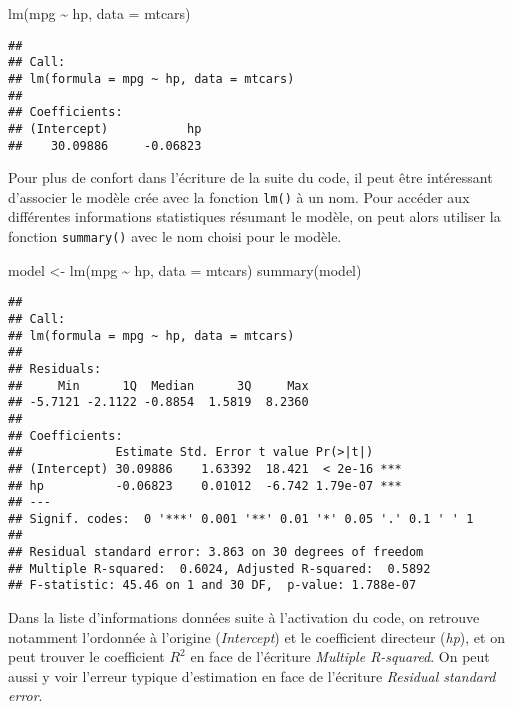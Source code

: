 \documentclass[
]{book}
\newenvironment{Shaded}{\begin{snugshade}}{\end{snugshade}}
\newcommand{\AttributeTok}[1]{\textcolor[rgb]{0.77,0.63,0.00}{#1}}
\newcommand{\FunctionTok}[1]{\textcolor[rgb]{0.00,0.00,0.00}{#1}}
\newcommand{\NormalTok}[1]{#1}
\newcommand{\OtherTok}[1]{\textcolor[rgb]{0.56,0.35,0.01}{#1}}
\newcommand{\SpecialCharTok}[1]{\textcolor[rgb]{0.00,0.00,0.00}{#1}}
\begin{document}
\begin{Shaded}
\begin{Highlighting}[]
\FunctionTok{lm}\NormalTok{(mpg }\SpecialCharTok{\textasciitilde{}}\NormalTok{ hp, }\AttributeTok{data =}\NormalTok{ mtcars)}
\end{Highlighting}
\end{Shaded}

\begin{verbatim}
## 
## Call:
## lm(formula = mpg ~ hp, data = mtcars)
## 
## Coefficients:
## (Intercept)           hp  
##    30.09886     -0.06823
\end{verbatim}

Pour plus de confort dans l'écriture de la suite du code, il peut être intéressant d'associer le modèle crée avec la fonction \texttt{lm()} à un nom. Pour accéder aux différentes informations statistiques résumant le modèle, on peut alors utiliser la fonction \texttt{summary()} avec le nom choisi pour le modèle.

\begin{Shaded}
\begin{Highlighting}[]
\NormalTok{model }\OtherTok{\textless{}{-}} \FunctionTok{lm}\NormalTok{(mpg }\SpecialCharTok{\textasciitilde{}}\NormalTok{ hp, }\AttributeTok{data =}\NormalTok{ mtcars)}
\FunctionTok{summary}\NormalTok{(model)}
\end{Highlighting}
\end{Shaded}

\begin{verbatim}
## 
## Call:
## lm(formula = mpg ~ hp, data = mtcars)
## 
## Residuals:
##     Min      1Q  Median      3Q     Max 
## -5.7121 -2.1122 -0.8854  1.5819  8.2360 
## 
## Coefficients:
##             Estimate Std. Error t value Pr(>|t|)    
## (Intercept) 30.09886    1.63392  18.421  < 2e-16 ***
## hp          -0.06823    0.01012  -6.742 1.79e-07 ***
## ---
## Signif. codes:  0 '***' 0.001 '**' 0.01 '*' 0.05 '.' 0.1 ' ' 1
## 
## Residual standard error: 3.863 on 30 degrees of freedom
## Multiple R-squared:  0.6024, Adjusted R-squared:  0.5892 
## F-statistic: 45.46 on 1 and 30 DF,  p-value: 1.788e-07
\end{verbatim}

Dans la liste d'informations données suite à l'activation du code, on retrouve notamment l'ordonnée à l'origine (\emph{Intercept}) et le coefficient directeur (\emph{hp}), et on peut trouver le coefficient \(R^2\) en face de l'écriture \emph{Multiple R-squared}. On peut aussi y voir l'erreur typique d'estimation en face de l'écriture \emph{Residual standard error}.
\end{document}
